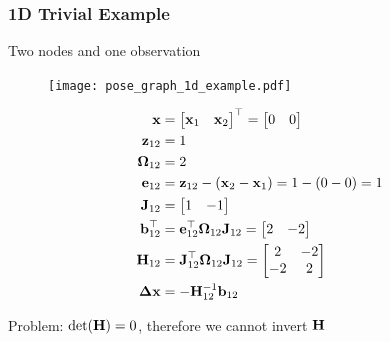    
   \begin{frame}
    \frametitle{1D Trivial Example}
   
    Two nodes and one observation
   
    \begin{figure}[!h]
    \texttt{[image: pose\_graph\_1d\_example.pdf]}
    \end{figure}
   
    \small
   
    \begin{align*}
    \boldsymbol{\mathbf{x}} &=
    \begin{bmatrix}
    \boldsymbol{\mathbf{x}}_{1} & \boldsymbol{\mathbf{x}}_{2}
    \end{bmatrix}^{\top}
    =
    \begin{bmatrix}
    0 & 0
    \end{bmatrix}\\
    \boldsymbol{\mathbf{z}}_{12} &= 1\\
    \boldsymbol{\mathbf{\Omega}}_{12} &= 2\\
    \boldsymbol{\mathbf{e}}_{12} &= \boldsymbol{\mathbf{z}}_{12} - (\boldsymbol{\mathbf{x}}_{2} - \boldsymbol{\mathbf{x}}_{1}) = 1 - (0 - 0) = 1\\
    \boldsymbol{\mathbf{J}}_{12} &=
    \begin{bmatrix}
    1 & -1
    \end{bmatrix}\\
    \boldsymbol{\mathbf{b}}_{12}^{\top} &= \boldsymbol{\mathbf{e}}_{12}^{\top} \boldsymbol{\mathbf{\Omega}}_{12} \boldsymbol{\mathbf{J}}_{12} =
    \begin{bmatrix}
    2 & -2
    \end{bmatrix}\\
    \boldsymbol{\mathbf{H}}_{12} &= \boldsymbol{\mathbf{J}}_{12}^{\top} \boldsymbol{\mathbf{\Omega}}_{12} \boldsymbol{\mathbf{J}}_{12} =
    \begin{bmatrix}
    2 & -2\\
    -2 & 2
    \end{bmatrix}\\
    \boldsymbol{\mathbf{\Delta}}\boldsymbol{\mathbf{x}} &= -{\boldsymbol{\mathbf{H}}}^{-1}_{12} \boldsymbol{\mathbf{b}}_{12}\\
    \end{align*}
   
    \begin{center}
    \alert{Problem:} $\det(\boldsymbol{\mathbf{H}}) = 0$, therefore we cannot invert $\boldsymbol{\mathbf{H}}$
    \end{center}
\end{frame}

